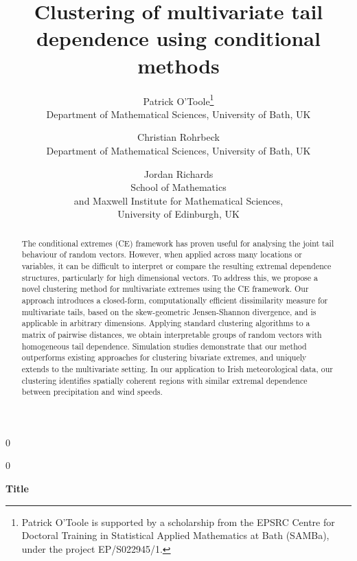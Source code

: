 \documentclass[12pt,compact]{article}
\newcommand{\blind}{0}
\begin{document}
\def\spacingset#1{\renewcommand{\baselinestretch}%
{#1}\small\normalsize} \spacingset{1}


\blind
{
  \title{\bf Clustering of multivariate tail dependence using conditional methods}
  \author{%
  Patrick O'Toole\thanks{Patrick O'Toole is supported by a scholarship from the EPSRC Centre for Doctoral Training in Statistical Applied Mathematics at Bath (SAMBa), under the project EP/S022945/1.}\\
  Department of Mathematical Sciences, University of Bath, UK
  \and
  Christian Rohrbeck\\
  Department of Mathematical Sciences, University of Bath, UK 
  \and
  Jordan Richards\\
  School of Mathematics \\
  and Maxwell Institute for Mathematical Sciences, \\
  University of Edinburgh, UK
  }
  \maketitle
} \fi

\blind
{
  \begin{center}
    {\LARGE\bf Title}
\end{center}
  \medskip
} \fi


\begin{abstract}
  The conditional extremes (CE) framework has proven useful for analysing the joint tail behaviour of random vectors.
  However, when applied across many locations or variables, it can be difficult to interpret or compare the resulting extremal dependence structures, particularly for high dimensional vectors. 
  To address this, we propose a novel clustering method for multivariate extremes using the CE framework.
  Our approach introduces a closed-form, computationally efficient dissimilarity measure for multivariate tails, based on the skew-geometric Jensen-Shannon divergence, and is applicable in arbitrary dimensions.
  Applying standard clustering algorithms to a matrix of pairwise distances, we obtain interpretable groups of random vectors with homogeneous tail dependence.
  Simulation studies demonstrate that our method outperforms existing approaches for clustering bivariate extremes, and uniquely extends to the multivariate setting. 
  In our application to Irish meteorological data, our clustering identifies spatially coherent regions with similar extremal dependence between precipitation and wind speeds. 
\end{abstract}
\end{document}
